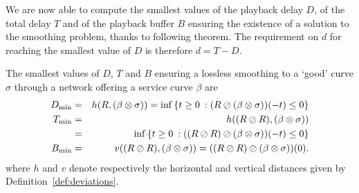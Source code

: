 We are now able to compute the smallest values of the playback delay $D$, of the total delay $T$
and of the playback buffer $B$ ensuring the existence of a solution to the smoothing problem,
thanks to following theorem.
The requirement on $d$ for reaching the smallest value of $D$ is therefore $d = T - D$.
\begin{theorem}
The smallest values of $D$, $T$ and $B$
ensuring a lossless smoothing to a `good' curve $\sigma$ through a network offering a service curve $\beta$
are
\begin{eqnarray}
 \mylabel{eq:optimalplaybackdelay}
D_{\min} & = & h(R, (\beta \otimes \sigma)) = \inf \left\{ t \geq 0 \: : (R \oslash (\beta \otimes \sigma)) (-t) \leq 0 \right\} \\
\mylabel{eq:optimaltotaldelay}
T_{\min} & = &  h((R \oslash R), (\beta \otimes \sigma)) \\
         & = &  \inf \left\{ t \geq 0 \: : ((R \oslash R) \oslash (\beta \otimes \sigma)) (-t) \leq 0 \right\} \nonumber \\
\mylabel{eq:optimalplaybackbuffer}
B_{\min} & = & v((R \oslash R),  (\beta \otimes \sigma)) = ((R \oslash R) \oslash (\beta \otimes \sigma))(0).
\end{eqnarray}
where $h$ and $v$ denote respectively the horizontal and vertical distances given by Definition~\ref{def:deviations}.
\end{theorem}

